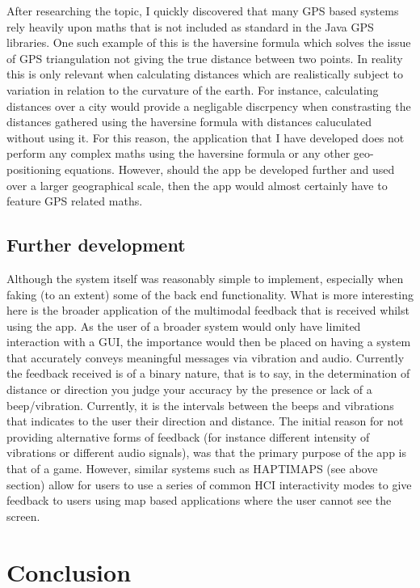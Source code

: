 \documentclass[12pt]{article} %
\begin{document}
After researching the topic, I quickly discovered that many GPS based systems rely heavily upon
maths that is not included as standard in the Java GPS libraries. One such example of this is the
haversine formula which solves the issue of GPS triangulation not giving the true distance between
two points. In reality this is only relevant when calculating distances which are realistically
subject to variation in relation to the curvature of the earth. For instance, calculating distances
over a city would provide a negligable discrpency when constrasting the distances gathered using
the haversine formula with distances caluculated without using it. For this reason, the application
that I have developed does not perform any complex maths using the haversine formula or any other
geo-positioning equations. However, should the app be developed further and used over a larger
geographical scale, then the app would almost certainly have to feature GPS related maths.

\subsection{Further development}                                                                   
\label{FurtherDevelopment}           
Although the system itself was reasonably simple to implement, especially when faking (to an extent)
some of the back end functionality. What is more interesting here is the broader application of the
multimodal feedback that is received whilst using the app. As the user of a broader system would
only have limited interaction with a GUI, the importance would then be placed on having a system
that accurately conveys meaningful messages via vibration and audio. Currently the feedback
received is of a binary nature, that is to say, in the determination of distance or direction you
judge your accuracy by the presence or lack of a beep/vibration. Currently, it is the intervals
between the beeps and vibrations that indicates to the user their direction and distance. The
initial reason for not providing alternative forms of feedback (for instance different intensity of
vibrations or different audio signals), was that the primary purpose of the app is that of a game.
However, similar systems such as HAPTIMAPS (see above section) allow for users to use a series of
common HCI interactivity modes to give feedback to users using map based applications where the
user cannot see the screen.

\newpage
\section{Conclusion} %
\end{document}
